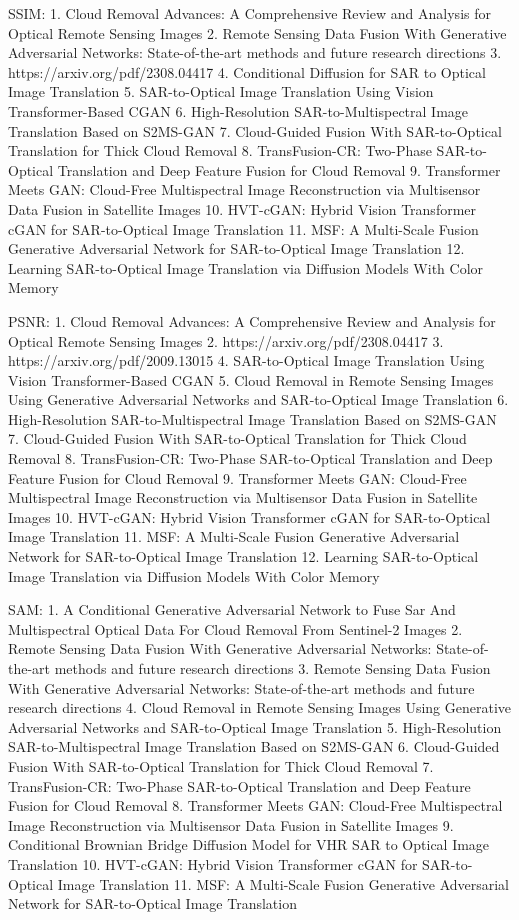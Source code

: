 SSIM:
1.	Cloud Removal Advances: A Comprehensive Review and Analysis for Optical Remote Sensing Images
2.	Remote Sensing Data Fusion With Generative Adversarial Networks: State-of-the-art methods and future research directions
3.	https://arxiv.org/pdf/2308.04417
4.	Conditional Diffusion for SAR to Optical Image Translation
5.	SAR-to-Optical Image Translation Using Vision Transformer-Based CGAN
6.	High-Resolution SAR-to-Multispectral Image Translation Based on S2MS-GAN
7.	Cloud-Guided Fusion With SAR-to-Optical Translation for Thick Cloud Removal
8.	TransFusion-CR: Two-Phase SAR-to-Optical Translation and Deep Feature Fusion for Cloud Removal
9.	Transformer Meets GAN: Cloud-Free Multispectral Image Reconstruction via Multisensor Data Fusion in Satellite Images
10.	HVT-cGAN: Hybrid Vision Transformer cGAN for SAR-to-Optical Image Translation
11.	MSF: A Multi-Scale Fusion Generative Adversarial Network for SAR-to-Optical Image Translation
12.	Learning SAR-to-Optical Image Translation via Diffusion Models With Color Memory

PSNR:
1.	Cloud Removal Advances: A Comprehensive Review and Analysis for Optical Remote Sensing Images
2.	https://arxiv.org/pdf/2308.04417
3.	https://arxiv.org/pdf/2009.13015
4.	SAR-to-Optical Image Translation Using Vision Transformer-Based CGAN
5.	Cloud Removal in Remote Sensing Images Using Generative Adversarial Networks and SAR-to-Optical Image Translation
6.	High-Resolution SAR-to-Multispectral Image Translation Based on S2MS-GAN
7.	Cloud-Guided Fusion With SAR-to-Optical Translation for Thick Cloud Removal
8.	TransFusion-CR: Two-Phase SAR-to-Optical Translation and Deep Feature Fusion for Cloud Removal
9.	Transformer Meets GAN: Cloud-Free Multispectral Image Reconstruction via Multisensor Data Fusion in Satellite Images
10.	HVT-cGAN: Hybrid Vision Transformer cGAN for SAR-to-Optical Image Translation
11.	MSF: A Multi-Scale Fusion Generative Adversarial Network for SAR-to-Optical Image Translation
12.	Learning SAR-to-Optical Image Translation via Diffusion Models With Color Memory

SAM: 
1.	A Conditional Generative Adversarial Network to Fuse Sar And Multispectral Optical Data For Cloud Removal From Sentinel-2 Images
2.	Remote Sensing Data Fusion With Generative Adversarial Networks: State-of-the-art methods and future research directions
3.	Remote Sensing Data Fusion With Generative Adversarial Networks: State-of-the-art methods and future research directions
4.	Cloud Removal in Remote Sensing Images Using Generative Adversarial Networks and SAR-to-Optical Image Translation
5.	High-Resolution SAR-to-Multispectral Image Translation Based on S2MS-GAN
6.	Cloud-Guided Fusion With SAR-to-Optical Translation for Thick Cloud Removal
7.	TransFusion-CR: Two-Phase SAR-to-Optical Translation and Deep Feature Fusion for Cloud Removal
8.	Transformer Meets GAN: Cloud-Free Multispectral Image Reconstruction via Multisensor Data Fusion in Satellite Images
9.	Conditional Brownian Bridge Diffusion Model for VHR SAR to Optical Image Translation
10.	HVT-cGAN: Hybrid Vision Transformer cGAN for SAR-to-Optical Image Translation
11.	MSF: A Multi-Scale Fusion Generative Adversarial Network for SAR-to-Optical Image Translation

